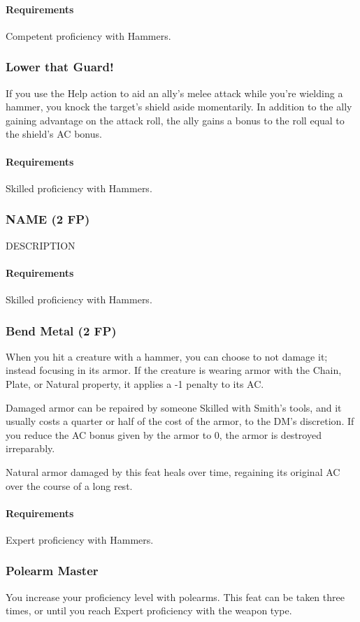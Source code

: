     \paragraph{Requirements} Competent proficiency with Hammers.
\subsubsection{Lower that Guard!} \label{feat::lowerthatguard}
    If you use the Help action to aid an ally's melee attack while you're wielding a hammer, you knock the target's shield aside momentarily.
    In addition to the ally gaining advantage on the attack roll, the ally gains a bonus to the roll equal to the shield's AC bonus.
    \paragraph{Requirements} Skilled proficiency with Hammers.
\subsubsection{NAME (2 FP)} \label{feat::name}
    DESCRIPTION
    \paragraph{Requirements} Skilled proficiency with Hammers.
\subsubsection{Bend Metal (2 FP)} \label{feat::bendmetal}
    When you hit a creature with a hammer, you can choose to not damage it; instead focusing in its armor.
    If the creature is wearing armor with the Chain, Plate, or Natural property, it applies a -1 penalty to its AC.

    Damaged armor can be repaired by someone Skilled with Smith's tools, and it usually costs a quarter or half of the cost of the armor, to the DM's discretion.
    If you reduce the AC bonus given by the armor to 0, the armor is destroyed irreparably.

    Natural armor damaged by this feat heals over time, regaining its original AC over the course of a long rest.
    \paragraph{Requirements} Expert proficiency with Hammers.
\subsubsection{Polearm Master} \label{feat::polearmmaster}
    You increase your proficiency level with polearms.
    This feat can be taken three times, or until you reach Expert proficiency with the weapon type.
